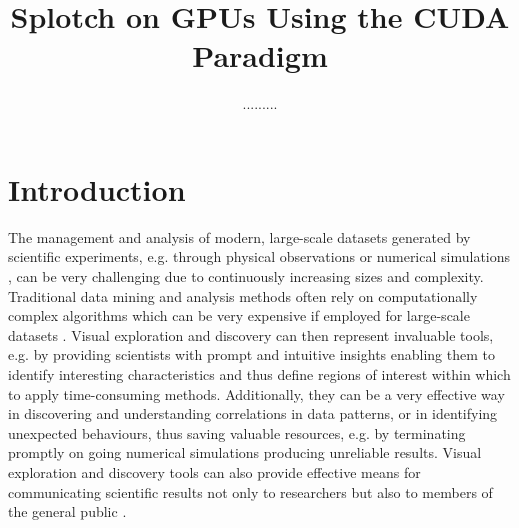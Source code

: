 \documentclass[11pt]{article}
\title{Splotch on GPUs Using the CUDA Paradigm}
\author{.........}
\begin{document}
\maketitle

\section{Introduction}
\label{sec:intro}

The management and analysis of modern, large-scale datasets generated by scientific experiments, e.g. through physical observations \cite{} or numerical simulations \cite{}, can be very challenging due to continuously increasing sizes and complexity. Traditional data mining and analysis methods often rely on computationally complex
algorithms \cite{} which can be very expensive if employed for 
large-scale datasets \cite{}. Visual exploration and discovery can then represent invaluable tools, e.g. by providing scientists with prompt and intuitive insights enabling them to identify interesting characteristics and thus define regions of interest within which
to apply time-consuming methods. Additionally, they can be a very effective way in discovering and understanding correlations in data patterns, or in identifying unexpected behaviours, thus saving valuable resources, e.g. by terminating promptly on going numerical simulations producing unreliable results. Visual exploration and discovery tools can also provide effective means for communicating scientific results not only to researchers \cite{} but also to members of the general public \cite{}.
\end{document}
